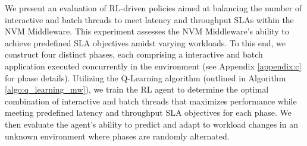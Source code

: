 


We present an evaluation of RL-driven policies aimed at balancing the number of interactive and batch threads to meet latency and throughput SLAs within the NVM Middleware. This experiment assesses the NVM Middleware's ability to achieve predefined SLA objectives amidst varying workloads. To this end, we construct four distinct phases, each comprising a interactive and batch application executed concurrently in the environment (see Appendix \ref{appendix:c} for phase details). Utilizing the Q-Learning algorithm (outlined in Algorithm \ref{algo:q_learning_mw}), we train the RL agent to determine the optimal combination of interactive and batch threads that maximizes performance while meeting predefined latency and throughput SLA objectives for each phase. We then evaluate the agent's ability to predict and adapt to workload changes in an unknown environment where phases are randomly alternated.

